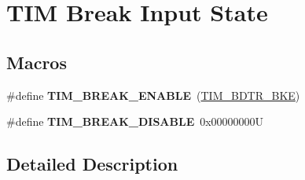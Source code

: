 \hypertarget{group___t_i_m___break___input__enable__disable}{}\section{T\+IM Break Input State}
\label{group___t_i_m___break___input__enable__disable}
\subsection*{Macros}
\begin{DoxyCompactItemize}
\item 
\mbox{\label{group___t_i_m___break___input__enable__disable_ga3f966247b03532b8d93f9bddc032d863}} 
\#define {\bfseries T\+I\+M\+\_\+\+B\+R\+E\+A\+K\+\_\+\+E\+N\+A\+B\+LE}~(\mbox{\hyperlink{group___peripheral___registers___bits___definition_ga74250b040dd9fd9c09dcc54cdd6d86d8}{T\+I\+M\+\_\+\+B\+D\+T\+R\+\_\+\+B\+KE}})
\item 
\mbox{\label{group___t_i_m___break___input__enable__disable_ga8b34ce60f3f08c4b0d924a6546939994}} 
\#define {\bfseries T\+I\+M\+\_\+\+B\+R\+E\+A\+K\+\_\+\+D\+I\+S\+A\+B\+LE}~0x00000000U
\end{DoxyCompactItemize}


\subsection{Detailed Description}
